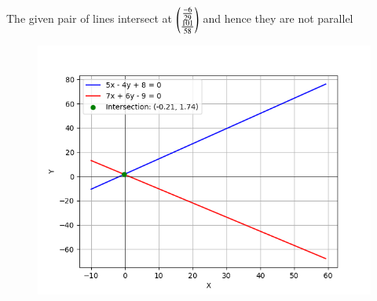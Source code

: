 \documentclass[journal]{IEEEtran}
\begin{document}
The given pair of lines intersect at $\begin{pmatrix}\frac{-6}{29} \\ \frac{101}{58}\end{pmatrix}$ and hence they are not parallel 
\begin{figure}[h!]
   \centering
   \includegraphics[width=\columnwidth]{figs/Figure_1.png}
\end{figure}
\end{document}
